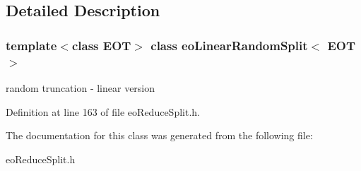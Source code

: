 \subsection{Detailed Description}
\subsubsection*{template$<$class EOT$>$ class eo\-Linear\-Random\-Split$<$ EOT $>$}

random truncation - linear version 



Definition at line 163 of file eo\-Reduce\-Split.h.

The documentation for this class was generated from the following file:\begin{CompactItemize}
\item 
eo\-Reduce\-Split.h\end{CompactItemize}
